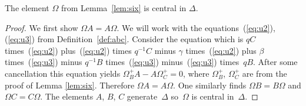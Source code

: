 \begin{Theorem}
\label{lem:center}
The element $\Omega$ from
Lemma~{\rm \ref{lem:six}} is central in $\Delta $.
\end{Theorem}

\begin{proof}
We f\/irst show $\Omega A = A \Omega $.
We will work with the equations~(\ref{eq:u2}),
(\ref{eq:u3}) from Def\/inition~\ref{def:abc}. Consider the equation which is
$qC $ times~(\ref{eq:u2}) plus~(\ref{eq:u2}) times $q^{-1}C$
minus $\gamma$ times~(\ref{eq:u2})
plus $\beta$ times~(\ref{eq:u3})
minus
$q^{-1}B$ times~(\ref{eq:u3})
minus~(\ref{eq:u3}) times~$qB$.
After some cancellation this equation yields
$\Omega^+_B A- A\Omega^+_C =0$, where
$\Omega^+_B$, $\Omega^+_C$
are from the proof of Lemma
\ref{lem:six}.
Therefore
$\Omega A= A\Omega $.
 One similarly
f\/inds
$
\Omega B = B \Omega$ and
$
\Omega C = C \Omega$.
The elements $A$, $B$, $C$ generate~$\Delta $ so~$\Omega$ is central in~$\Delta$.
\end{proof}
